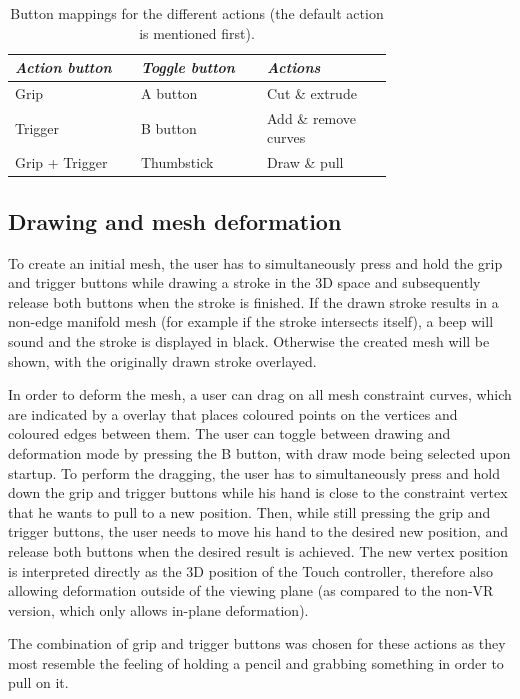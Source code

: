 \begin{table}
    \centering
    \begin{tabular}{p{0.25\linewidth}p{0.25\linewidth}p{0.25\linewidth}}
    \toprule
    \emph{Action button} & \emph{Toggle button} & \emph{Actions}\\
    \midrule
		Grip & A button &Cut \& extrude\\
		Trigger  &B button &Add \& remove curves\\
		Grip + Trigger  &Thumbstick &Draw \& pull\\
    \bottomrule
    \end{tabular}
    \caption[Button mappings]{Button mappings for the different actions (the default action is mentioned first).\label{tab:buttonmap}}
\end{table}

\subsection{Drawing and mesh deformation}
To create an initial mesh, the user has to simultaneously press and hold the grip and trigger buttons while drawing a stroke in the 3D space and subsequently release both buttons when the stroke is finished. If the drawn stroke results in a non-edge manifold mesh (for example if the stroke intersects itself), a beep will sound and the stroke is displayed in black. Otherwise the created mesh will be shown, with the originally drawn stroke overlayed. 

In order to deform the mesh, a user can drag on all mesh constraint curves, which are indicated by a overlay that places coloured points on the vertices and coloured edges between them. The user can toggle between drawing and deformation mode by pressing the B button, with draw mode being selected upon startup. To perform the dragging, the user has to simultaneously press and hold down the grip and trigger buttons while his hand is close to the constraint vertex that he wants to pull to a new position. Then, while still pressing the grip and trigger buttons, the user needs to move his hand to the desired new position, and release both buttons when the desired result is achieved. The new vertex position is interpreted directly as the 3D position of the Touch controller, therefore also allowing deformation outside of the viewing plane (as compared to the non-VR version, which only allows in-plane deformation). 

The combination of grip and trigger buttons was chosen for these actions as they most resemble the feeling of holding a pencil and grabbing something in order to pull on it. 

